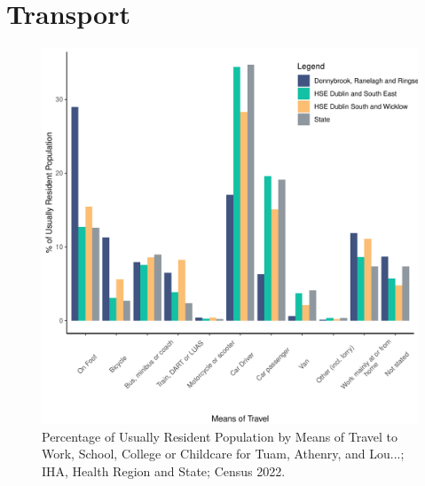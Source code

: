 \documentclass{article}
\begin{document}
\section{Transport}\label{sect:Trans}
\begin{figure}[H]
	\centering
	\includegraphics[width = 120mm]{../figures/TravelED.pdf}
	\caption{Percentage of Usually Resident Population by Means of Travel to Work, School, College or Childcare for Tuam, Athenry, and Lou...; IHA, Health Region and State; Census 2022.}
	\label{fig:vbnv}
	\end{figure}
\end{document}
